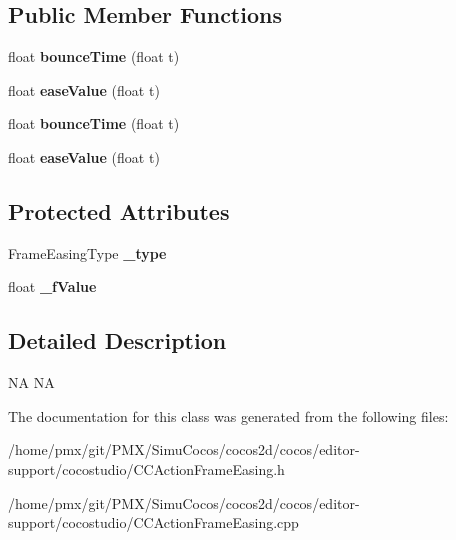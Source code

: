 \subsection*{Public Member Functions}
\begin{DoxyCompactItemize}
\item 
\mbox{\label{classcocostudio_1_1ActionFrameEasing_a11f9997f2cf554e662a9c268535e5880}} 
float {\bfseries bounce\+Time} (float t)
\item 
\mbox{\label{classcocostudio_1_1ActionFrameEasing_a2181bf2308e1cfc316674253021ea1e2}} 
float {\bfseries ease\+Value} (float t)
\item 
\mbox{\label{classcocostudio_1_1ActionFrameEasing_a11f9997f2cf554e662a9c268535e5880}} 
float {\bfseries bounce\+Time} (float t)
\item 
\mbox{\label{classcocostudio_1_1ActionFrameEasing_a2181bf2308e1cfc316674253021ea1e2}} 
float {\bfseries ease\+Value} (float t)
\end{DoxyCompactItemize}
\subsection*{Protected Attributes}
\begin{DoxyCompactItemize}
\item 
\mbox{\label{classcocostudio_1_1ActionFrameEasing_ac32c873cd04198fe53442ae889b3cd2e}} 
Frame\+Easing\+Type {\bfseries \+\_\+type}
\item 
\mbox{\label{classcocostudio_1_1ActionFrameEasing_ad61e1f08a9f04c4dbc74c68008e500e3}} 
float {\bfseries \+\_\+f\+Value}
\end{DoxyCompactItemize}


\subsection{Detailed Description}
NA  NA 

The documentation for this class was generated from the following files\+:\begin{DoxyCompactItemize}
\item 
/home/pmx/git/\+P\+M\+X/\+Simu\+Cocos/cocos2d/cocos/editor-\/support/cocostudio/C\+C\+Action\+Frame\+Easing.\+h\item 
/home/pmx/git/\+P\+M\+X/\+Simu\+Cocos/cocos2d/cocos/editor-\/support/cocostudio/C\+C\+Action\+Frame\+Easing.\+cpp\end{DoxyCompactItemize}
